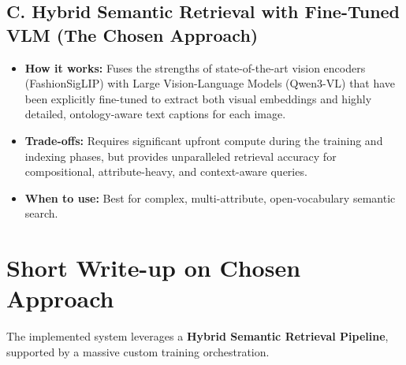 \documentclass[11pt,a4paper]{article}
\begin{document}
\subsection*{C. Hybrid Semantic Retrieval with Fine-Tuned VLM (The Chosen Approach)}
\begin{itemize}
    \item \textbf{How it works:} Fuses the strengths of state-of-the-art vision encoders (FashionSigLIP) with Large Vision-Language Models (Qwen3-VL) that have been explicitly fine-tuned to extract both visual embeddings and highly detailed, ontology-aware text captions for each image.
    \item \textbf{Trade-offs:} Requires significant upfront compute during the training and indexing phases, but provides unparalleled retrieval accuracy for compositional, attribute-heavy, and context-aware queries.
    \item \textbf{When to use:} Best for complex, multi-attribute, open-vocabulary semantic search.
\end{itemize}

\section{Short Write-up on Chosen Approach}

The implemented system leverages a \textbf{Hybrid Semantic Retrieval Pipeline}, supported by a massive custom training orchestration.
\end{document}
